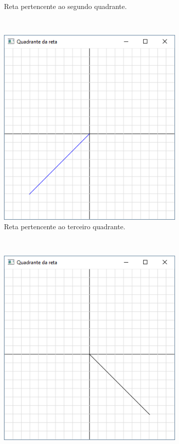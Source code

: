 \begin{renumerate}
\begin{figure}[h!]
\begin{subfigure}[t]{0.2\textwidth}
        \caption{Reta pertencente ao segundo quadrante.}
        \label{fig:cap01_ex4b}
    \end{subfigure}
    ~
    \begin{subfigure}[t]{0.2\textwidth}
        \centerline{\includegraphics[width=.9\textwidth]{img/cap1_ex4c}}
        \caption{Reta pertencente ao terceiro quadrante.}
        \label{fig:cap01_ex4c}
    \end{subfigure}
    ~
    \begin{subfigure}[t]{0.2\textwidth}
        \centerline{\includegraphics[width=.9\textwidth]{img/cap1_ex4d}}

\end{subfigure}
\end{figure}
\end{renumerate}

